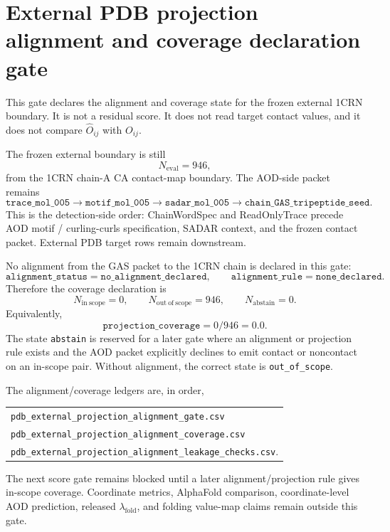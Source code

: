 \section{External PDB projection alignment and coverage declaration gate}

This gate declares the alignment and coverage state for the frozen external 1CRN boundary. It is not a residual score. It does not read target contact values, and it does not compare \(\widehat O_{ij}\) with \(O_{ij}\).

The frozen external boundary is still
\[
N_{\mathrm{eval}}=946,
\]
from the 1CRN chain-A CA contact-map boundary. The AOD-side packet remains
\[
\texttt{trace\_mol\_005}\to\texttt{motif\_mol\_005}\to
\texttt{sadar\_mol\_005}\to\texttt{chain\_GAS\_tripeptide\_seed}.
\]
This is the detection-side order: ChainWordSpec and ReadOnlyTrace precede AOD motif / curling-curls specification, SADAR context, and the frozen contact packet. External PDB target rows remain downstream.

No alignment from the GAS packet to the 1CRN chain is declared in this gate:
\[
\texttt{alignment\_status}=\texttt{no\_alignment\_declared},
\qquad
\texttt{alignment\_rule}=\texttt{none\_declared}.
\]
Therefore the coverage declaration is
\[
N_{\mathrm{in\ scope}}=0,
\qquad
N_{\mathrm{out\ of\ scope}}=946,
\qquad
N_{\mathrm{abstain}}=0.
\]
Equivalently,
\[
\texttt{projection\_coverage}=0/946=0.0.
\]
The state \texttt{abstain} is reserved for a later gate where an alignment or projection rule exists and the AOD packet explicitly declines to emit contact or noncontact on an in-scope pair. Without alignment, the correct state is \texttt{out\_of\_scope}.

The alignment/coverage ledgers are, in order,
\begin{center}\small
\begin{tabular}{l}
\texttt{pdb\_external\_projection\_alignment\_gate.csv}\\
\texttt{pdb\_external\_projection\_alignment\_coverage.csv}\\
\texttt{pdb\_external\_projection\_alignment\_leakage\_checks.csv}.
\end{tabular}
\end{center}
The next score gate remains blocked until a later alignment/projection rule gives in-scope coverage. Coordinate metrics, AlphaFold comparison, coordinate-level AOD prediction, released \(\lambda_{\mathrm{fold}}\), and folding value-map claims remain outside this gate.
